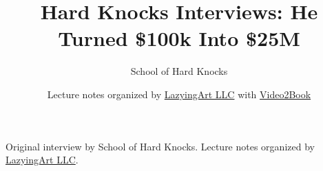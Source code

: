 \documentclass[11pt,oneside]{book}
\begin{document}
\frontmatter
\title{Hard Knocks Interviews: He Turned \$100k Into \$25M}
\author{School of Hard Knocks}
\date{Lecture notes organized by \href{https://lazying.art}{LazyingArt LLC} with \href{https://github.com/lachlanchen/Video2Book}{Video2Book}}
\maketitle
\begin{center}
\small Original interview by School of Hard Knocks. Lecture notes organized by \href{https://lazying.art}{LazyingArt LLC}.
\end{center}
\clearpage
\mainmatter

\end{document}
